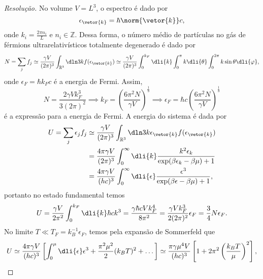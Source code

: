 \begin{proof}[Resolução]
    No volume \(V = L^3\), o espectro é dado por
    \begin{equation*}
        \epsilon_{\vetor{k}} = \hbar\norm{\vetor{k}} c,
    \end{equation*}
    onde \(k_i = \frac{2\pi n_i}{L}\) e \(n_i \in \mathbb{Z}\). Dessa forma, o número médio de partículas no gás de férmions ultrarelativísticos totalmente degenerado é dado por
    \begin{equation*}
        N = \sum_j f_j \simeq \frac{\gamma V}{(2\pi)^3} \int_{\mathbb{R}^3} \dln3k f(\epsilon_{\vetor{k}}) \simeq \frac{\gamma V}{(2\pi)^3} \int_0^{k_F} \dli{k} \int_{0}^\pi k \dli{\theta} \int_0^{2\pi} k \sin\theta \dli{\varphi},
    \end{equation*}
    onde \(\epsilon_F = \hbar k_F c\) é a energia de Fermi. Assim,
    \begin{equation*}
        N = \frac{2\gamma Vk_F^3}{3(2\pi)^2} \implies k_F = \left(\frac{6\pi^2 N}{\gamma V}\right)^{\frac13} \implies \epsilon_F = \hbar c \left(\frac{6\pi^2 N}{\gamma V}\right)^{\frac13}
    \end{equation*}
    é a expressão para a energia de Fermi. A energia do sistema é dada por
    \begin{align*}
        U = \sum_j \epsilon_j f_j
        &\simeq \frac{\gamma V}{(2\pi)^3} \int_{\mathbb{R}^3} \dln3k \epsilon_{\vetor{k}} f(\epsilon_{\vetor{k}}) \\
        &= \frac{4\pi \gamma V}{(2 \pi)^3} \int_{0}^\infty \dli{k} \frac{k^2 \epsilon_{k}}{\exp({\beta \epsilon_k - \beta \mu})+ 1} \\
        &= \frac{4\pi \gamma V}{(h c)^3} \int_0^\infty \dli{\epsilon} \frac{\epsilon^3}{\exp(\beta \epsilon - \beta \mu) + 1},
    \end{align*}
    portanto no estado fundamental temos
    \begin{equation*}
        U = \frac{\gamma V}{2\pi^2} \int_0^{k_F} \dli{k} \hbar c k^3 = \frac{\gamma \hbar c V k_F^4}{8\pi^2} = \frac{\gamma V k_F^3}{2 (2\pi)^2}\epsilon_F = \frac34 N \epsilon_F.
    \end{equation*}
    No limite \(T \ll T_F = k_B^{-1} \epsilon_F\), temos pela expansão de Sommerfeld que
    \begin{equation*}
        U \simeq \frac{4\pi\gamma V}{(hc)^3} \left[\int_0^\mu \dli{\epsilon} \epsilon^3 + \frac{\pi^2\mu^2}{2}(k_B T)^2 + \dots\right] \simeq \frac{\pi\gamma \mu^4 V}{(hc)^3}\left[1 + 2\pi^2 \left(\frac{k_BT}{\mu}\right)^2\right],

\end{equation*}
\end{proof}
